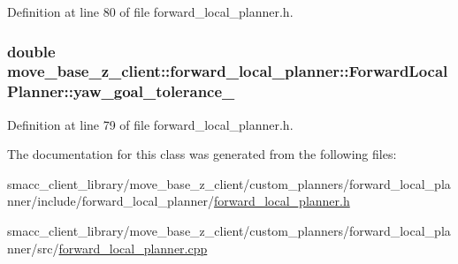 Definition at line 80 of file forward\+\_\+local\+\_\+planner.\+h.

\subsubsection[{\texorpdfstring{yaw\+\_\+goal\+\_\+tolerance\+\_\+}{yaw_goal_tolerance_}}]{\setlength{\rightskip}{0pt plus 5cm}double move\+\_\+base\+\_\+z\+\_\+client\+::forward\+\_\+local\+\_\+planner\+::\+Forward\+Local\+Planner\+::yaw\+\_\+goal\+\_\+tolerance\+\_\+\hspace{0.3cm}{\ttfamily [private]}}\hypertarget{classmove__base__z__client_1_1forward__local__planner_1_1ForwardLocalPlanner_aaf1bdb59cd920b103023d2fb52c4c508}{}\label{classmove__base__z__client_1_1forward__local__planner_1_1ForwardLocalPlanner_aaf1bdb59cd920b103023d2fb52c4c508}


Definition at line 79 of file forward\+\_\+local\+\_\+planner.\+h.



The documentation for this class was generated from the following files\+:\begin{DoxyCompactItemize}
\item 
smacc\+\_\+client\+\_\+library/move\+\_\+base\+\_\+z\+\_\+client/custom\+\_\+planners/forward\+\_\+local\+\_\+planner/include/forward\+\_\+local\+\_\+planner/\hyperlink{forward__local__planner_8h}{forward\+\_\+local\+\_\+planner.\+h}\item 
smacc\+\_\+client\+\_\+library/move\+\_\+base\+\_\+z\+\_\+client/custom\+\_\+planners/forward\+\_\+local\+\_\+planner/src/\hyperlink{forward__local__planner_8cpp}{forward\+\_\+local\+\_\+planner.\+cpp}\end{DoxyCompactItemize}
